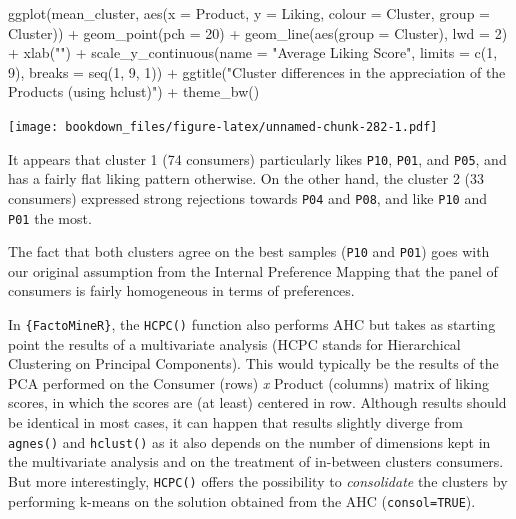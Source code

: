 \documentclass[
]{krantz}
\makeatletter
\newenvironment{Shaded}{\begin{snugshade}}{\end{snugshade}}
\newcommand{\AttributeTok}[1]{\textcolor[rgb]{0.61,0.61,0.61}{#1}}
\newcommand{\DecValTok}[1]{\textcolor[rgb]{0.06,0.06,0.06}{#1}}
\newcommand{\FunctionTok}[1]{\textcolor[rgb]{0,0,0}{#1}}
\newcommand{\NormalTok}[1]{#1}
\newcommand{\SpecialCharTok}[1]{\textcolor[rgb]{0,0,0}{#1}}
\newcommand{\StringTok}[1]{\textcolor[rgb]{0.5,0.5,0.5}{#1}}
\renewenvironment{quote}{\begin{VF}}{\end{VF}}
\newenvironment{kframe}{%
\medskip{}
\setlength{\fboxsep}{.8em}
 \def\at@end@of@kframe{}%
 \ifinner\ifhmode%
  \def\at@end@of@kframe{\end{minipage}}%
  \begin{minipage}{\columnwidth}%
 \fi\fi%
 \def\FrameCommand##1{\hskip\@totalleftmargin \hskip-\fboxsep
 \colorbox{shadecolor}{##1}\hskip-\fboxsep
     \hskip-\linewidth \hskip-\@totalleftmargin \hskip\columnwidth}%
 \MakeFramed {\advance\hsize-\width
   \@totalleftmargin\z@ \linewidth\hsize
   \@setminipage}}%
 {\par\unskip\endMakeFramed%
 \at@end@of@kframe}
\renewenvironment{Shaded}{\begin{kframe}}{\end{kframe}}
\makeatother
\begin{document}
\begin{Shaded}
\begin{Highlighting}[]
\FunctionTok{ggplot}\NormalTok{(mean\_cluster, }\FunctionTok{aes}\NormalTok{(}\AttributeTok{x =}\NormalTok{ Product, }\AttributeTok{y =}\NormalTok{ Liking, }\AttributeTok{colour =}\NormalTok{ Cluster, }\AttributeTok{group =}\NormalTok{ Cluster)) }\SpecialCharTok{+}
  \FunctionTok{geom\_point}\NormalTok{(}\AttributeTok{pch =} \DecValTok{20}\NormalTok{) }\SpecialCharTok{+}
  \FunctionTok{geom\_line}\NormalTok{(}\FunctionTok{aes}\NormalTok{(}\AttributeTok{group =}\NormalTok{ Cluster), }\AttributeTok{lwd =} \DecValTok{2}\NormalTok{) }\SpecialCharTok{+}
  \FunctionTok{xlab}\NormalTok{(}\StringTok{""}\NormalTok{) }\SpecialCharTok{+}
  \FunctionTok{scale\_y\_continuous}\NormalTok{(}\AttributeTok{name =} \StringTok{"Average Liking Score"}\NormalTok{, }\AttributeTok{limits =} \FunctionTok{c}\NormalTok{(}\DecValTok{1}\NormalTok{, }\DecValTok{9}\NormalTok{), }\AttributeTok{breaks =} \FunctionTok{seq}\NormalTok{(}\DecValTok{1}\NormalTok{, }\DecValTok{9}\NormalTok{, }\DecValTok{1}\NormalTok{)) }\SpecialCharTok{+}
  \FunctionTok{ggtitle}\NormalTok{(}\StringTok{"Cluster differences in the appreciation of the Products (using hclust)"}\NormalTok{) }\SpecialCharTok{+}
  \FunctionTok{theme\_bw}\NormalTok{()}
\end{Highlighting}
\end{Shaded}

\texttt{[image: bookdown\_files/figure-latex/unnamed-chunk-282-1.pdf]}

It appears that cluster 1 (74 consumers) particularly likes \texttt{P10}, \texttt{P01}, and \texttt{P05}, and has a fairly flat liking pattern otherwise. On the other hand, the cluster 2 (33 consumers) expressed strong rejections towards \texttt{P04} and \texttt{P08}, and like \texttt{P10} and \texttt{P01} the most.

The fact that both clusters agree on the best samples (\texttt{P10} and \texttt{P01}) goes with our original assumption from the Internal Preference Mapping that the panel of consumers is fairly homogeneous in terms of preferences.

\begin{quote}
In \texttt{\{FactoMineR\}}, the \texttt{HCPC()} function also performs AHC but takes as starting point the results of a multivariate analysis (HCPC stands for Hierarchical Clustering on Principal Components). This would typically be the results of the PCA performed on the Consumer (rows) \emph{x} Product (columns) matrix of liking scores, in which the scores are (at least) centered in row.
Although results should be identical in most cases, it can happen that results slightly diverge from \texttt{agnes()} and \texttt{hclust()} as it also depends on the number of dimensions kept in the multivariate analysis and on the treatment of in-between clusters consumers. But more interestingly, \texttt{HCPC()} offers the possibility to \emph{consolidate} the clusters by performing k-means on the solution obtained from the AHC (\texttt{consol=TRUE}).
\end{quote}
\end{document}
